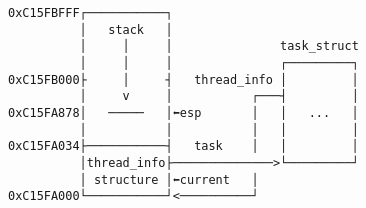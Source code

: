 \documentclass[varwidth=40em]{standalone}
\begin{document}
\begin{verbatim}
0xC15FBFFF┌───────────┐
          │   stack   │
          │     │     │               task_struct 
          │     │     │               ┌─────────┐
0xC15FB000├     │     ┤   thread_info │         │
          │     v     │           ┌───┤         │
0xC15FA878│   ─────   │⬅esp       │   │   ...   │
          │           │           │   │         │
0xC15FA034├───────────┤   task    │   │         │
          │thread_info├──────────────>└─────────┘
          │ structure │⬅current   │
0xC15FA000└───────────┘<──────────┘
\end{verbatim}
\end{document}
